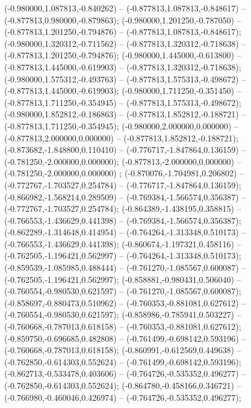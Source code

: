  (-0.980000,1.087813,-0.840262) -- (-0.877813,1.087813,-0.848617) -- (-0.877813,0.980000,-0.879863);
 (-0.980000,1.201250,-0.787050) -- (-0.877813,1.201250,-0.794876) -- (-0.877813,1.087813,-0.848617);
 (-0.980000,1.320312,-0.711562) -- (-0.877813,1.320312,-0.718638) -- (-0.877813,1.201250,-0.794876);
 (-0.980000,1.445000,-0.613800) -- (-0.877813,1.445000,-0.619903) -- (-0.877813,1.320312,-0.718638);
 (-0.980000,1.575312,-0.493763) -- (-0.877813,1.575313,-0.498672) -- (-0.877813,1.445000,-0.619903);
 (-0.980000,1.711250,-0.351450) -- (-0.877813,1.711250,-0.354945) -- (-0.877813,1.575313,-0.498672);
 (-0.980000,1.852812,-0.186863) -- (-0.877813,1.852812,-0.188721) -- (-0.877813,1.711250,-0.354945);
 (-0.980000,2.000000,0.000000) -- (-0.877813,2.000000,0.000000) -- (-0.877813,1.852812,-0.188721);
 (-0.873682,-1.848800,0.110410) -- (-0.776717,-1.847864,0.136159) -- (-0.781250,-2.000000,0.000000);
 (-0.877813,-2.000000,0.000000) -- (-0.781250,-2.000000,0.000000) ;
 (-0.870076,-1.704981,0.206802) -- (-0.772767,-1.703527,0.254784) -- (-0.776717,-1.847864,0.136159);
 (-0.866982,-1.568214,0.289509) -- (-0.769384,-1.566574,0.356387) -- (-0.772767,-1.703527,0.254784);
 (-0.864389,-1.438195,0.358815) -- (-0.766553,-1.436629,0.441398) -- (-0.769384,-1.566574,0.356387);
 (-0.862289,-1.314648,0.414954) -- (-0.764264,-1.313348,0.510173) -- (-0.766553,-1.436629,0.441398);
 (-0.860674,-1.197321,0.458116) -- (-0.762505,-1.196421,0.562997) -- (-0.764264,-1.313348,0.510173);
 (-0.859539,-1.085985,0.488444) -- (-0.761270,-1.085567,0.600087) -- (-0.762505,-1.196421,0.562997);
 (-0.858881,-0.980431,0.506040) -- (-0.760554,-0.980530,0.621597) -- (-0.761270,-1.085567,0.600087);
 (-0.858697,-0.880473,0.510962) -- (-0.760353,-0.881081,0.627612) -- (-0.760554,-0.980530,0.621597);
 (-0.858986,-0.785941,0.503227) -- (-0.760668,-0.787013,0.618158) -- (-0.760353,-0.881081,0.627612);
 (-0.859750,-0.696685,0.482808) -- (-0.761499,-0.698142,0.593196) -- (-0.760668,-0.787013,0.618158);
 (-0.860991,-0.612569,0.449638) -- (-0.762850,-0.614303,0.552624) -- (-0.761499,-0.698142,0.593196);
 (-0.862713,-0.533478,0.403606) -- (-0.764726,-0.535352,0.496277) -- (-0.762850,-0.614303,0.552624);
 (-0.864780,-0.458166,0.346721) -- (-0.766980,-0.460046,0.426974) -- (-0.764726,-0.535352,0.496277);
